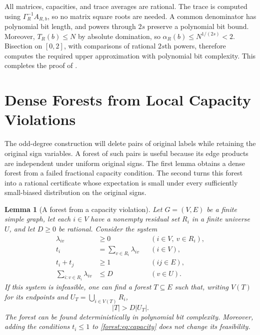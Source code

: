 \documentclass[letterpaper,11pt]{article}
\newtheorem{lemma}[theorem]{Lemma}
\theoremstyle{definition}
\begin{document}
All matrices, capacities, and trace averages are rational.
The trace is computed using $\Gamma_R^{-1}A_{R,b}$, so no matrix square
roots are needed. A common denominator has polynomial bit length, and
powers through $2s$ preserve a polynomial bit bound.
Moreover, $T_R(b)\leq N$ by absolute domination, so
$\alpha_R(b)\leq N^{1/(2s)}<2$.
Bisection on $[0,2]$, with comparisons of rational $2s$th powers,
therefore computes the required upper approximation with polynomial bit
complexity. This completes the proof of .



\section{Dense Forests from Local Capacity Violations}
\label{sec:forests}

The odd-degree construction will delete pairs of original labels while
retaining the original sign variables.  A forest of such pairs is useful
because its edge products are independent under uniform original signs.
The first lemma obtains a dense forest from a failed fractional capacity
condition.  The second turns this forest into a rational certificate whose
expectation is small under every sufficiently small-biased distribution on the
original signs.

\begin{lemma}[A forest from a capacity violation]
\label{lem:forest-alternative}
Let $G=(V,E)$ be a finite simple graph, let each $i\in V$ have a nonempty
residual set $R_i$ in a finite universe $U$, and let $D\geq 0$ be rational.
Consider the system
\begin{equation}
\begin{aligned}
 \lambda_{iv}&\geq 0 &&(i\in V,\ v\in R_i),\\
 t_i&=\sum_{v\in R_i}\lambda_{iv} &&(i\in V),\\
 t_i+t_j&\geq 1 &&(ij\in E),\\
 \sum_{i:v\in R_i}\lambda_{iv}&\leq D &&(v\in U).
\end{aligned}
\label{forest:eq:capacity}
\end{equation}
If this system is infeasible, one can find a forest $T\subseteq E$ such
that, writing $V(T)$ for its endpoints and
$U_T=\bigcup_{i\in V(T)}R_i$,
\begin{equation}
 |T|>D|U_T|.
 \label{forest:eq:density}
\end{equation}
The forest can be found deterministically in polynomial bit complexity.
Moreover, adding the conditions $t_i\leq 1$ to
\eqref{forest:eq:capacity} does not change its feasibility.
\end{lemma}
\end{document}
